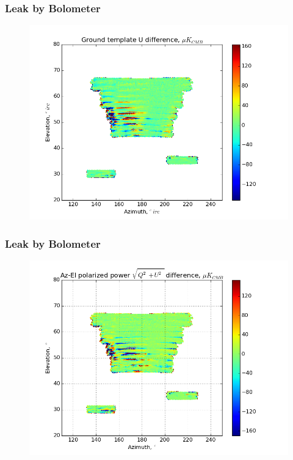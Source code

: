 \documentclass{beamer}
\begin{document}
\begin{frame}
\frametitle{Leak by Bolometer}
\begin{figure}
\includegraphics[width=0.9\linewidth]{dU_gt_LEAK_BY_BOLO.png}
\end{figure}
\end{frame}

\begin{frame}
\frametitle{Leak by Bolometer}
\begin{figure}
\includegraphics[width=0.9\linewidth]{dMag_gt_LEAK_BY_BOLO.png}
\end{figure}
\end{frame}
\end{document}
